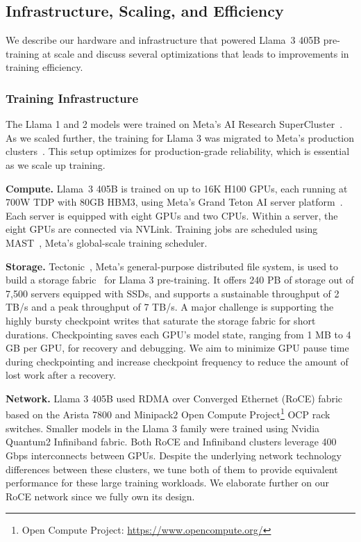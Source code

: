 \newcommand{\cq}[1]{\textcolor{red}{\{CQ: #1\}}} 

\subsection{Infrastructure, Scaling, and Efficiency}
\label{section:pretraining_model_scaling}
We describe our hardware and infrastructure that powered Llama~3 405B pre-training at scale and discuss several optimizations that leads to improvements in training efficiency.

\subsubsection{Training Infrastructure} The Llama 1 and 2 models were trained on Meta's AI Research SuperCluster~\citep{Lee22RSC}. As we scaled further, the training for Llama 3 was migrated to Meta's production clusters~\citep{lee2024building}. This setup optimizes for production-grade reliability, which is essential as we scale up training.

\textbf{Compute.}
Llama~3 405B is trained on up to 16K H100 GPUs, each running at 700W TDP with 80GB HBM3, using Meta's Grand Teton AI server platform~\citep{various2022grandteton}. Each server is equipped with eight GPUs and two CPUs. Within a server, the eight GPUs are connected via NVLink. Training jobs are scheduled using MAST~\citep{choudhury2024mast}, Meta's global-scale training scheduler.

\textbf{Storage.} 
Tectonic~\citep{pan2021tectonicfs}, Meta's general-purpose distributed file system, is used to build a storage fabric~\citep{battey2024storage} for Llama 3 pre-training. It offers 240 PB of storage out of 7,500 servers equipped with SSDs, and supports a sustainable throughput of 2 TB/s and a peak throughput of 7 TB/s. A major challenge is supporting the highly bursty checkpoint writes that saturate the storage fabric for short durations. Checkpointing saves each GPU’s model state, ranging from 1 MB to 4 GB per GPU, for recovery and debugging. We aim to minimize GPU pause time during checkpointing and increase checkpoint frequency to reduce the amount of lost work after a recovery. 

\textbf{Network.}
Llama 3 405B used RDMA over Converged Ethernet (RoCE) fabric based on the Arista 7800 and Minipack2 Open Compute Project\footnote{Open Compute Project: \url{https://www.opencompute.org/}} OCP rack switches. Smaller models in the Llama 3 family were trained using Nvidia Quantum2 Infiniband fabric. Both RoCE and Infiniband clusters leverage 400 Gbps interconnects between GPUs.  Despite the underlying network technology differences between these clusters, we tune both of them to provide equivalent performance for these large training workloads. We elaborate further on our RoCE network since we fully own its design.

